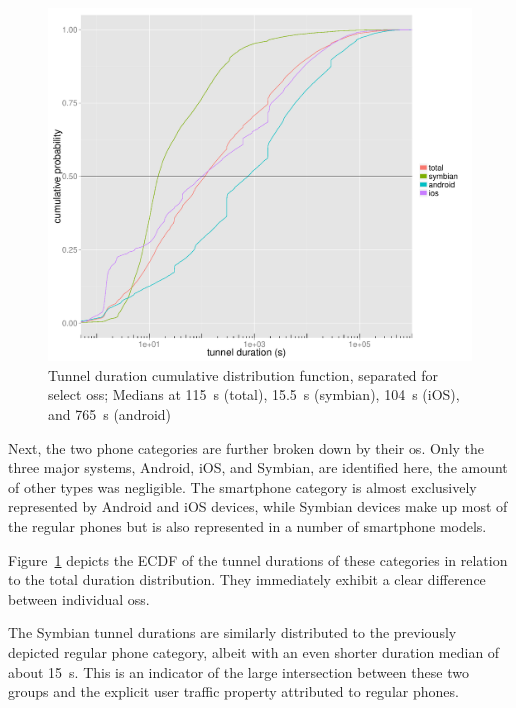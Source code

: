 \begin{figure}[htb]
    \centering
    \includegraphics[width=1.0\textwidth]{images/R-tunnel-duration-operating-system.pdf}
    \caption{Tunnel duration cumulative distribution function, separated for select \glspl{os}; Medians at \SI{115}{\second} (total), \SI{15.5}{\second} (symbian), \SI{104}{\second} (iOS), and \SI{765}{\second} (android)}
    \label{c4:fig:cdf-duration-os}
\end{figure}

Next, the two phone categories are further broken down by their \gls{os}. Only the three major systems, Android, iOS, and Symbian, are identified here, the amount of other types was negligible. The smartphone category is almost exclusively represented by Android and iOS devices, while Symbian devices make up most of the regular phones but is also represented in a number of smartphone models.

Figure~\ref{c4:fig:cdf-duration-os} depicts the \gls{ECDF} of the tunnel durations of these categories in relation to the total duration distribution. They immediately exhibit a clear difference between individual \glspl{os}.

The Symbian tunnel durations are similarly distributed to the previously depicted regular phone category, albeit with an even shorter duration median of about \SI{15}{\second}. This is an indicator of the large intersection between these two groups and the explicit user traffic property attributed to regular phones.

